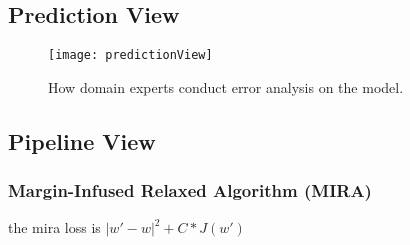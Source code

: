 \subsection{Prediction View}

\begin{figure}[htbp]
\centering
\vspace{-2mm}
 \texttt{[image: predictionView]}
 \caption{How domain experts conduct error analysis on the model.}
\label{fig:modelPipeline}
\end{figure}


\subsection{Pipeline View}

\subsubsection{Margin-Infused Relaxed Algorithm (MIRA)}
the mira loss is $|w' - w|^2 + C * J(w')$
